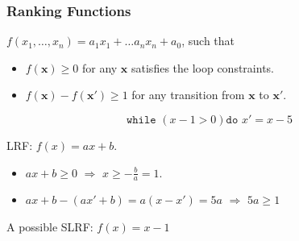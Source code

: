 \documentclass[11pt]{beamer}
\begin{document}
\begin{frame}\frametitle{Ranking Functions}

\begin{definition}

$f(x_1, \ldots, x_n) = a_1x_1 + \ldots a_nx_n + a_0$, such that

\begin{itemize}
\item $f(\textbf{x}) \ge 0$ for any $\textbf{x}$ satisfies the loop constraints.

\item $f(\textbf{x}) - f(\textbf{x}') \ge 1$ for any transition from $\textbf{x}$ to $\textbf{x}'$.



\end{itemize}
\end{definition}

\begin{example}
\[\texttt{while }( x - 1 > 0) \texttt{do } x' = x - 5\]

LRF: $f(x) = ax + b$.
\begin{itemize}
\item $ax + b \ge 0$ $\Rightarrow$ $x \ge -\frac{b}{a} = 1$.
\item $ax + b - (ax' + b) = a(x - x') = 5a$ $\Rightarrow$ $5a \ge 1$
\end{itemize}
A possible SLRF: $f(x) = x - 1$
\end{example}


\end{frame}
\end{document}
